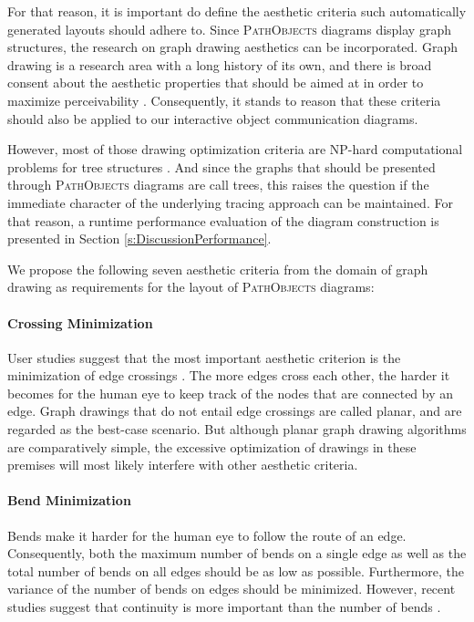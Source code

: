 For that reason, it is important do define the aesthetic criteria such automatically generated layouts should adhere to.
Since \textsc{PathObjects} diagrams display graph structures, the research on graph drawing aesthetics can be incorporated.
Graph drawing is a research area with a long history of its own, and there is broad consent about the aesthetic properties that should be aimed at in order to maximize perceivability \cite{battista_graph_1998, kaufmann_drawing_2001, diehl_software_2007}.
Consequently, it stands to reason that these criteria should also be applied to our interactive object communication diagrams.

However, most of those drawing optimization criteria are NP-hard computational problems for tree structures \cite{battista_graph_1998}.
And since the graphs that should be presented through \textsc{PathObjects} diagrams are call trees, this raises the question if the immediate character of the underlying tracing approach can be maintained.
For that reason, a runtime performance evaluation of the diagram construction is presented in Section \ref{s:DiscussionPerformance}.

We propose the following seven aesthetic criteria from the domain of graph drawing as requirements for the layout of \textsc{PathObjects} diagrams:

\paragraph{Crossing Minimization} User studies suggest that the most important aesthetic criterion is the minimization of edge crossings \cite{purchase_effective_2000, purchase_graph_2004, purchase_graph_2010}.
The more edges cross each other, the harder it becomes for the human eye to keep track of the nodes that are connected by an edge.
Graph drawings that do not entail edge crossings are called planar, and are regarded as the best-case scenario.
But although planar graph drawing algorithms are comparatively simple, the excessive optimization of drawings in these premises will most likely interfere with other aesthetic criteria.

\paragraph{Bend Minimization} Bends make it harder for the human eye to follow the route of an edge.
Consequently, both the maximum number of bends on a single edge as well as the total number of bends on all edges should be as low as possible.
Furthermore, the variance of the number of bends on edges should be minimized.
However, recent studies suggest that continuity is more important than the number of bends \cite{diehl_software_2007}.

